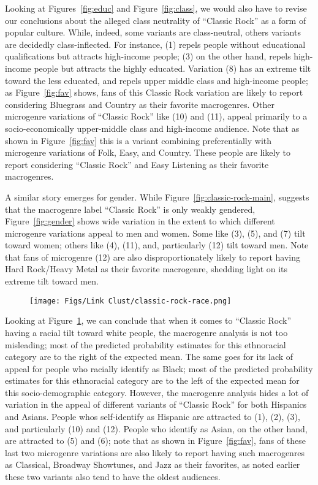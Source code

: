 Looking at Figures~\ref{fig:educ} and Figure~\ref{fig:class}, we would also have to revise our conclusions about the alleged class neutrality of ``Classic Rock'' as a form of popular culture. While, indeed, some variants are class-neutral, others variants are decidedly class-inflected. For instance, (1) repels people without educational qualifications but attracts high-income people; (3) on the other hand, repels high-income people but attracts the highly educated. Variation (8) has an extreme tilt toward the less educated, and repels upper middle class and high-income people; as Figure~\ref{fig:fav} shows, fans of this Classic Rock variation are likely to report considering Bluegrass and Country as their favorite macrogenres. Other microgenre variations of ``Classic Rock'' like (10) and (11), appeal primarily to a socio-economically upper-middle class and high-income audience. Note that as shown in Figure~\ref{fig:fav} this is a variant combining preferentially with microgenre variations of Folk, Easy, and Country. These people are likely to report considering ``Classic Rock'' and Easy Listening as their favorite macrogenres. 

A similar story emerges for gender. While Figure~\ref{fig:classic-rock-main}, suggests that the macrogenre label ``Classic Rock'' is only weakly gendered, Figure~\ref{fig:gender} shows wide variation in the extent to which different microgenre variations appeal to men and women. Some like (3), (5), and (7) tilt toward women; others like (4), (11), and, particularly (12) tilt toward men. Note that fans of microgenre (12) are also disproportionately likely to report having Hard Rock/Heavy Metal as their favorite macrogenre, shedding light on its extreme tilt toward men. 

\begin{figure}[ht!]
    \centering
    \texttt{[image: Figs/Link Clust/classic-rock-race.png]}
    \caption{}
    \label{fig:race}
\end{figure}

Looking at Figure~\ref{fig:race}, we can conclude that when it comes to ``Classic Rock'' having a racial tilt toward white people, the macrogenre analysis is not too misleading; most of the predicted probability estimates for this ethnoracial category are to the right of the expected mean. The same goes for its lack of appeal for people who racially identify as Black; most of the predicted probability estimates for this ethnoracial category are to the left of the expected mean for this socio-demographic category. However, the macrogenre analysis hides a lot of variation in the appeal of different variants of ``Classic Rock'' for both Hispanics and Asians. People whos self-identify as Hispanic are attracted to (1), (2), (3), and particularly (10) and (12). People who identify as Asian, on the other hand, are attracted to (5) and (6); note that as shown in Figure~\ref{fig:fav}, fans of these last two microgenre variations are also likely to report having such macrogenres as Classical, Broadway Showtunes, and Jazz as their favorites, as noted earlier these two variants also tend to have the oldest audiences. 
